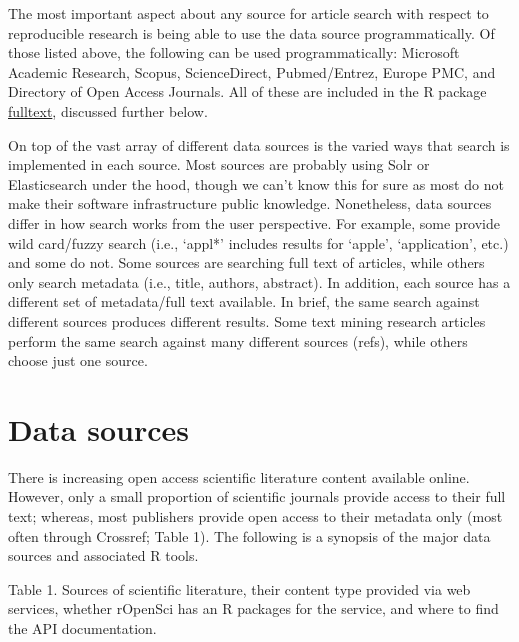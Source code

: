 \documentclass[author-year, review, 11pt]{components/elsarticle} %
\begin{document}
The most important aspect about any source for article search with
respect to reproducible research is being able to use the data source
programmatically. Of those listed above, the following can be used
programmatically: Microsoft Academic Research, Scopus, ScienceDirect,
Pubmed/Entrez, Europe PMC, and Directory of Open Access Journals. All of
these are included in the R package
\href{https://github.com/ropensci/fulltext}{fulltext}, discussed further
below.

On top of the vast array of different data sources is the varied ways
that search is implemented in each source. Most sources are probably
using Solr or Elasticsearch under the hood, though we can't know this
for sure as most do not make their software infrastructure public
knowledge. Nonetheless, data sources differ in how search works from the
user perspective. For example, some provide wild card/fuzzy search
(i.e., `appl*' includes results for `apple', `application', etc.) and
some do not. Some sources are searching full text of articles, while
others only search metadata (i.e., title, authors, abstract). In
addition, each source has a different set of metadata/full text
available. In brief, the same search against different sources produces
different results. Some text mining research articles perform the same
search against many different sources (refs), while others choose just
one source.

\hypertarget{data-sources}{%
\section{Data sources}\label{data-sources}}

There is increasing open access scientific literature content available
online. However, only a small proportion of scientific journals provide
access to their full text; whereas, most publishers provide open access
to their metadata only (most often through Crossref; Table 1). The
following is a synopsis of the major data sources and associated R
tools.

\newpage

Table 1. Sources of scientific literature, their content type provided
via web services, whether rOpenSci has an R packages for the service,
and where to find the API documentation.
\end{document}
